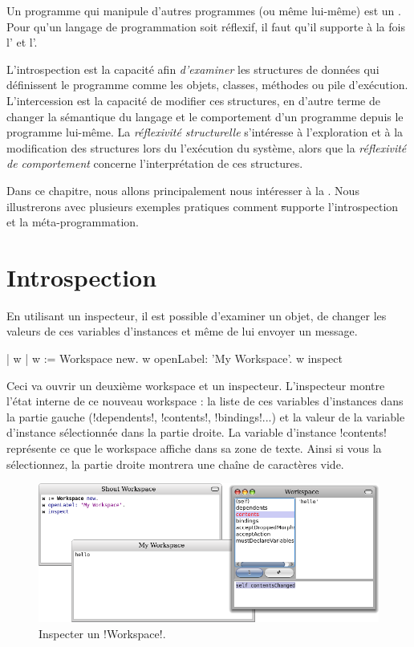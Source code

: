 \documentclass[a4paper,10pt,twoside]{book}
\begin{document}
Un programme qui manipule d'autres programmes (ou même lui-même) est un .
Pour qu'un langage de programmation soit réflexif, il faut qu'il supporte à la fois l' et l'.

L'introspection est la capacité afin \emph{d'examiner} les structures de données qui définissent le programme comme les objets, classes, méthodes ou pile d'exécution.
L'intercession est la capacité de modifier ces structures, en d'autre terme de changer la sémantique du langage et le comportement d'un programme depuis le programme lui-même.
La \emph{réflexivité structurelle} s'intéresse à l'exploration et à la modification des structures lors du l'exécution du système, alors que la \emph{réflexivité de comportement} concerne l'interprétation de ces structures.

Dans ce chapitre, nous allons principalement nous intéresser à la .
Nous illustrerons avec plusieurs exemples pratiques comment \st supporte l'introspection et la méta-programmation.

\section{Introspection}

En utilisant un inspecteur, il est possible d'examiner un objet, de changer les valeurs de ces variables d'instances et même de lui envoyer un message.

\begin{code}{| w |}
w := Workspace new.
w openLabel: 'My Workspace'.
w inspect
\end{code}

Ceci va ouvrir un deuxième workspace et un inspecteur.
L'inspecteur montre l'état interne de ce nouveau workspace : la liste de ces variables d'instances dans la partie gauche (\ct!dependents!, \ct!contents!, \ct!bindings!...) et la valeur de la variable d'instance sélectionnée dans la partie droite.
La variable d'instance \ct!contents! représente ce que le workspace affiche dans sa zone de texte. Ainsi si vous la sélectionnez, la partie droite montrera une chaîne de caractères vide.

\begin{figure}[ht]\centering
	\includegraphics[width=\linewidth]{workspaceInspector}
	\caption{Inspecter un \ct!Workspace!.}
\end{figure}
\end{document}
